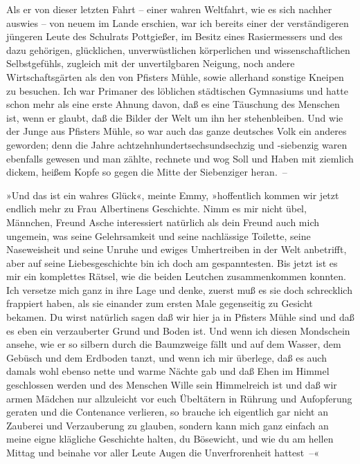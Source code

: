 Als er von dieser letzten Fahrt – einer wahren Weltfahrt, wie es
sich nachher auswies – von neuem im Lande erschien, war ich bereits
einer der verständigeren jüngeren Leute des Schulrats Pottgießer,
im Besitz eines Rasiermessers und des dazu gehörigen, glücklichen,
unverwüstlichen körperlichen und wissenschaftlichen Selbstgefühls,
zugleich mit der unvertilgbaren Neigung, noch andere
Wirtschaftsgärten als den von Pfisters Mühle, sowie allerhand
sonstige Kneipen zu besuchen. Ich war Primaner des löblichen
städtischen Gymnasiums und hatte schon mehr als eine erste Ahnung
davon, daß es eine Täuschung des Menschen ist, wenn er glaubt, daß
die Bilder der Welt um ihn her stehenbleiben. Und wie der Junge aus
Pfisters Mühle, so war auch das ganze deutsches Volk ein anderes
geworden; denn die Jahre achtzehnhundertsechsundsechzig und
-siebenzig waren ebenfalls gewesen und man zählte, rechnete und wog
Soll und Haben mit ziemlich dickem, heißem Kopfe so gegen die Mitte
der Siebenziger heran.~–

»Und das ist ein wahres Glück«, meinte Emmy, »hoffentlich kommen
wir jetzt endlich mehr zu Frau Albertinens Geschichte. Nimm es mir
nicht übel, Männchen, Freund Asche interessiert natürlich als dein
Freund auch mich ungemein, was seine Gelehrsamkeit und seine
nachlässige Toilette, seine Naseweisheit und seine Unruhe und
ewiges Umhertreiben in der Welt anbetrifft, aber auf seine
Liebesgeschichte bin ich doch am gespanntesten. Bis jetzt ist es
mir ein komplettes Rätsel, wie die beiden Leutchen zusammenkommen
konnten. Ich versetze mich ganz in ihre Lage und denke, zuerst muß
es sie doch schrecklich frappiert haben, als sie einander zum
ersten Male gegenseitig zu Gesicht bekamen. Du wirst natürlich
sagen daß wir hier ja in Pfisters Mühle sind und daß es eben ein
verzauberter Grund und Boden ist. Und wenn ich diesen Mondschein
ansehe, wie er so silbern durch die Baumzweige fällt und auf dem
Wasser, dem Gebüsch und dem Erdboden tanzt, und wenn ich mir
überlege, daß es auch damals wohl ebenso nette und warme Nächte gab
und daß Ehen im Himmel geschlossen werden und des Menschen Wille
sein Himmelreich ist und daß wir armen Mädchen nur allzuleicht vor
euch Übeltätern in Rührung und Aufopferung geraten und die
Contenance verlieren, so brauche ich eigentlich gar nicht an
Zauberei und Verzauberung zu glauben, sondern kann mich ganz
einfach an meine eigne klägliche Geschichte halten, du Bösewicht,
und wie du am hellen Mittag und beinahe vor aller Leute Augen die
Unverfrorenheit hattest~–«

